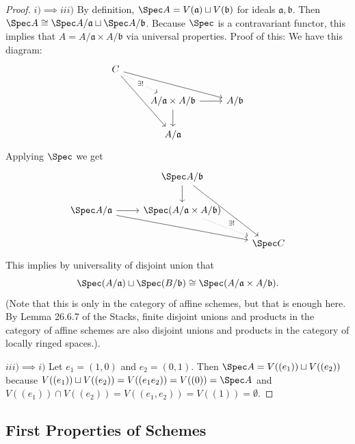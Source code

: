 \begin{proof}
	$i) \implies iii) $ By definition, $\Spec A = V(\mathfrak{a})\sqcup V(\mathfrak{b}) $ for ideals $\mathfrak{a},\mathfrak{b} $.
	Then $\Spec A \cong \Spec A / \mathfrak{a} \sqcup \Spec A / \mathfrak{b} $.
	Because $\Spec $ is a contravariant functor, this implies that $A = A / \mathfrak{a} \times A / \mathfrak{b} $ via universal properties.
	Proof of this:
	We have this diagram:
	\[\begin{tikzcd}
		C \\
	& {A / \mathfrak{a} \times A / \mathfrak{b}} & A / \mathfrak{b} \\
	& A / \mathfrak{a}
	\arrow["{\exists !}"{description}, dotted, from=1-1, to=2-2]
	\arrow[from=1-1, to=2-3]
	\arrow[from=1-1, to=3-2]
	\arrow[from=2-2, to=2-3]
	\arrow[from=2-2, to=3-2]
	\end{tikzcd}\]
	Applying $\Spec $ we get
	\[\begin{tikzcd}
		& \Spec A / \mathfrak{b} \\
		\Spec A / \mathfrak{a} & {\Spec(A / \mathfrak{a} \times A / \mathfrak{b})} \\
		&& \Spec C
		\arrow[from=1-2, to=2-2]
		\arrow[from=1-2, to=3-3]
		\arrow[from=2-1, to=2-2]
		\arrow[from=2-1, to=3-3]
		\arrow["\exists !",dotted,from=2-2, to=3-3]
	\end{tikzcd}\]
	This implies by universality of disjoint union that
	\[
		\Spec(A / \mathfrak{a}) \sqcup \Spec(B / \mathfrak{b}) \cong \Spec(A / \mathfrak{a} \times A / \mathfrak{b})
	.\]
	(Note that this is only in the category of affine schemes, but that is enough here. By Lemma 26.6.7 of the Stacks, finite disjoint unions and products in the category of affine schemes are also disjoint unions and products in the category of locally ringed spaces.).

	$iii) \implies i) $ Let $e_{1} = (1,0)$ and $e_{2} = (0,1) $.
	Then $\Spec A = V((e_{1}))\sqcup V((e_{2})) $ because $V((e_{1}))\sqcup V((e_{2})) = V((e_{1}e_{2})) = V((0)) = \Spec A $ and $V((e_{1}))\cap V((e_{2})) = V((e_{1},e_{2})) = V((1)) = \emptyset$.
\end{proof}

\subsection{First Properties of Schemes}

